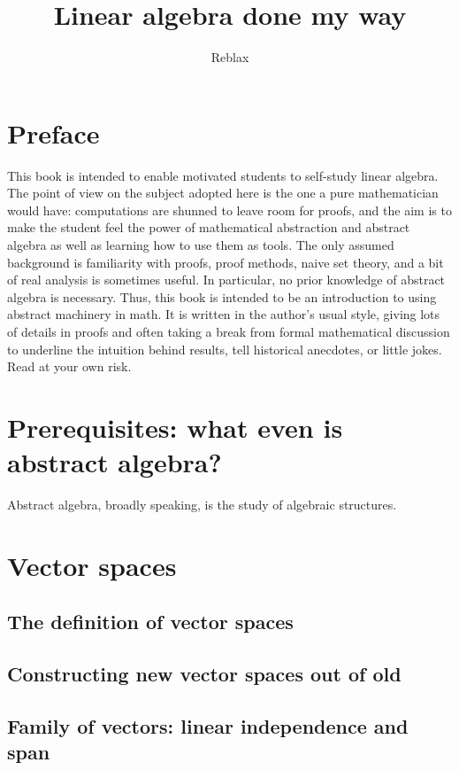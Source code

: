 \documentclass{book}
\title{Linear algebra done my way}
\author{Reblax}
\date{}
\theoremstyle{plain}
\theoremstyle{definition}
\theoremstyle{remark}
\begin{document}
\maketitle

\tableofcontents

\chapter*{Preface}
This book is intended to enable motivated students to self-study linear algebra. The point of view on the subject adopted here is the one a pure mathematician would have: computations are shunned to leave room for proofs, and the aim is to make the student feel the power of mathematical abstraction and abstract algebra as well as learning how to use them as tools. The only assumed background is familiarity with proofs, proof methods, naive set theory, and a bit of real analysis is sometimes useful. In particular, no prior knowledge of abstract algebra is necessary. Thus, this book is intended to be an introduction to using abstract machinery in math. It is written in the author's usual style, giving lots of details in proofs and often taking a break from formal mathematical discussion to underline the intuition behind results, tell historical anecdotes, or little jokes. Read at your own risk.

\chapter{Prerequisites: what even is abstract algebra?}

Abstract algebra, broadly speaking, is the study of algebraic structures. 

\chapter{Vector spaces}

\section{The definition of vector spaces}

\section{Constructing new vector spaces out of old}

\section{Family of vectors: linear independence and span}
\end{document}
